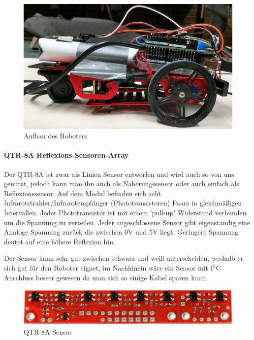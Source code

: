 \documentclass[12pt]{article}
\begin{document}
\begin{figure}[thb]
\includegraphics[width=1\textwidth]{images/vehicle_side_small.jpg}
\caption{Aufbau des Roboters}
\end{figure}

\paragraph{QTR-8A Reflexions-Sensoren-Array} Der QTR-8A ist zwar als Linien Sensor entworfen und wird auch so von uns genutzt, jedoch kann man ihn auch als Näherungssensor oder auch einfach als Reflexionssensor. Auf dem Modul befinden sich acht Infrarotstrahler/Infrarotempfänger (Phototransistoren) Paare in gleichmäßigen Intervallen. Jeder Phototransistor ist mit einem 'pull-up' Widerstand verbunden um die Spannung zu verteilen. Jeder angeschlossene Sensor gibt eigenständig eine Analoge Spannung zurück die zwischen 0V und 5V liegt. Geringere Spannung deutet auf eine höhere Reflexion hin.

Der Sensor kann sehr gut zwischen schwarz und weiß unterscheiden, weshalb er sich gut für den Roboter eignet, im Nachhinein wäre ein Sensor mit I$^2$C Anschluss besser gewesen da man sich so einige Kabel sparen kann.
\begin{figure}[thb]
\vspace{0.5cm}
\includegraphics[width=1\textwidth]{images/QTR-8A.jpg}\par
\caption{QTR-8A Sensor\cite{QTR8A-front}}
\end{figure}
\end{document}
